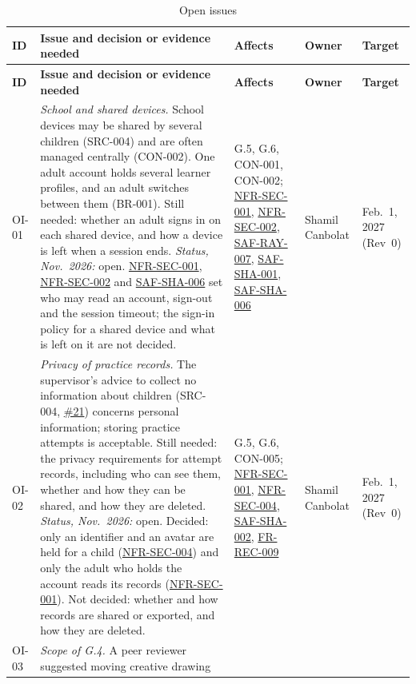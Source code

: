 \documentclass[12pt]{article}
\renewcommand{\_}{\textunderscore\allowbreak}%
\newcommand{\reqref}[1]{\hyperref[req:#1]{#1}}
\begin{document}
{\small
\begin{longtable}{@{}>{\raggedright\arraybackslash}p{}%
>{\raggedright\arraybackslash}p{}%
>{\raggedright\arraybackslash}p{}%
>{\raggedright\arraybackslash}p{}%
>{\raggedright\arraybackslash}p{}@{}} \caption{Open
issues}\label{tab:openIssues}\\
\toprule
\textbf{ID} & \textbf{Issue and decision or evidence needed} & \textbf{Affects}
& \textbf{Owner} & \textbf{Target} \\
\midrule
\endfirsthead
\toprule
\textbf{ID} & \textbf{Issue and decision or evidence needed} & \textbf{Affects}
& \textbf{Owner} & \textbf{Target} \\
\midrule
\endhead
\bottomrule
\endlastfoot
OI-01 & \emph{School and shared devices.} School devices may be shared by
several children (SRC-004) and are often managed centrally (CON-002). One adult
account holds several learner profiles, and an adult switches between them
(BR-001). Still needed: whether an adult signs in on each shared device, and how
a device is left when a session ends. \emph{Status, Nov.\ 2026:} open.
\reqref{NFR-SEC-001}, \reqref{NFR-SEC-002} and \reqref{SAF-SHA-006} set who may
read an account, sign-out and the session timeout; the sign-in policy for a
shared device and what is left on it are not decided. & G.5, G.6, CON-001,
CON-002; \reqref{NFR-SEC-001}, \reqref{NFR-SEC-002}, \reqref{SAF-RAY-007},
\reqref{SAF-SHA-001}, \reqref{SAF-SHA-006} & Shamil Canbolat & Feb.\ 1, 2027
(Rev~0) \\
\addlinespace
OI-02 & \emph{Privacy of practice records.} The supervisor's advice to collect
no information about children (SRC-004,
\href{https://github.com/AHMEDELZARIA/squigglr/issues/21}{\#21}) concerns
personal information; storing practice attempts is acceptable. Still needed: the
privacy requirements for attempt records, including who can see them, whether
and how they can be shared, and how they are deleted. \emph{Status, Nov.\
2026:} open. Decided: only an identifier and an avatar are held for a child
(\reqref{NFR-SEC-004}) and only the adult who holds the account reads its
records (\reqref{NFR-SEC-001}). Not decided: whether and how records are shared
or exported, and how they are deleted. & G.5, G.6, CON-005;
\reqref{NFR-SEC-001}, \reqref{NFR-SEC-004}, \reqref{SAF-SHA-002},
\reqref{FR-REC-009} & Shamil Canbolat & Feb.\ 1, 2027 (Rev~0) \\
\addlinespace
OI-03 & \emph{Scope of G.4.} A peer reviewer suggested moving creative drawing

\end{longtable}}
\end{document}
